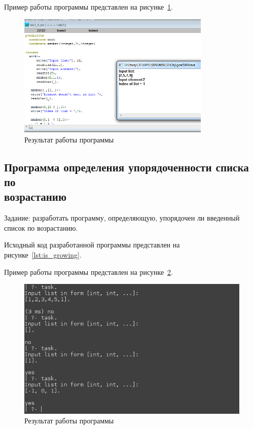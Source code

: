 Пример работы программы представлен на рисунке~\ref{fig:idx_by_el}.

\begin{figure}[h!]
  \centering
  \includegraphics[width=92mm]{img/idx_by_el}
  \caption{Результат работы программы}
  \label{fig:idx_by_el}
\end{figure}


\subsection{Программа определения упорядоченности списка по \\ возрастанию}

Задание: разработать программу, определяющую,
упорядочен ли введенный список по возрастанию.

Исходный код разработанной программы представлен на
рисунке~\ref{lst:is_growing}.



Пример работы программы представлен на рисунке~\ref{fig:is_growing}.

\begin{figure}[h!]
  \centering
  \includegraphics[width=120mm]{img/is_growing}
  \caption{Результат работы программы}
  \label{fig:is_growing}
\end{figure}

